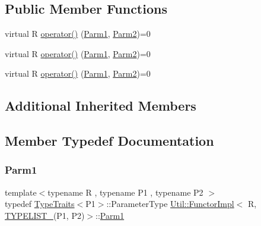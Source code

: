 \subsection*{Public Member Functions}
\begin{DoxyCompactItemize}
\item 
virtual R \mbox{\hyperlink{classUtil_1_1FunctorImpl_3_01R_00_01TYPELIST__2_07P1_00_01P2_08_4_a5c9378116c2036cb377d239c8d454375}{operator()}} (\mbox{\hyperlink{structUtil_1_1Private_1_1FunctorImplBase_a9d61e693d6c616dea5bd9d9073c7d21a}{Parm1}}, \mbox{\hyperlink{structUtil_1_1Private_1_1FunctorImplBase_a554085cd798ef14838a59b528f0feb2e}{Parm2}})=0
\item 
virtual R \mbox{\hyperlink{classUtil_1_1FunctorImpl_3_01R_00_01TYPELIST__2_07P1_00_01P2_08_4_a5c9378116c2036cb377d239c8d454375}{operator()}} (\mbox{\hyperlink{structUtil_1_1Private_1_1FunctorImplBase_a9d61e693d6c616dea5bd9d9073c7d21a}{Parm1}}, \mbox{\hyperlink{structUtil_1_1Private_1_1FunctorImplBase_a554085cd798ef14838a59b528f0feb2e}{Parm2}})=0
\item 
virtual R \mbox{\hyperlink{classUtil_1_1FunctorImpl_3_01R_00_01TYPELIST__2_07P1_00_01P2_08_4_a5c9378116c2036cb377d239c8d454375}{operator()}} (\mbox{\hyperlink{structUtil_1_1Private_1_1FunctorImplBase_a9d61e693d6c616dea5bd9d9073c7d21a}{Parm1}}, \mbox{\hyperlink{structUtil_1_1Private_1_1FunctorImplBase_a554085cd798ef14838a59b528f0feb2e}{Parm2}})=0
\end{DoxyCompactItemize}
\subsection*{Additional Inherited Members}


\subsection{Member Typedef Documentation}
\mbox{\label{classUtil_1_1FunctorImpl_3_01R_00_01TYPELIST__2_07P1_00_01P2_08_4_a74b37eda530bf33969c4a0eadc2596a5}} 
\subsubsection{\texorpdfstring{Parm1}{Parm1}\hspace{0.1cm}{\footnotesize\ttfamily [1/3]}}
{\footnotesize\ttfamily template$<$typename R , typename P1 , typename P2 $>$ \\
typedef \mbox{\hyperlink{classUtil_1_1TypeTraits}{Type\+Traits}}$<$P1$>$\+::Parameter\+Type \mbox{\hyperlink{classUtil_1_1FunctorImpl}{Util\+::\+Functor\+Impl}}$<$ R, \mbox{\hyperlink{adat__devel__install_2include_2adat_2typelist_8h_a311cb99af993804c6737ae46c5cbfaff}{T\+Y\+P\+E\+L\+I\+S\+T\+\_}}(P1, P2)$>$\+::\mbox{\hyperlink{structUtil_1_1Private_1_1FunctorImplBase_a9d61e693d6c616dea5bd9d9073c7d21a}{Parm1}}}

